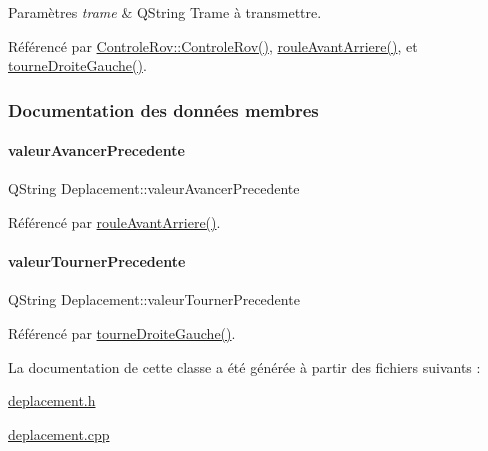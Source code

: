 \begin{DoxyParams}{Paramètres}
{\em trame} & Q\+String Trame à transmettre. \\
\hline
\end{DoxyParams}


Référencé par \hyperlink{class_controle_rov_acc4d5fea26770217df978d43df2ad51e}{Controle\+Rov\+::\+Controle\+Rov()}, \hyperlink{class_deplacement_a65a1c6adfe5114d3cfefa631e0c91618}{roule\+Avant\+Arriere()}, et \hyperlink{class_deplacement_a164cc606a6c5b8d55c1e5475d4d112e0}{tourne\+Droite\+Gauche()}.



\subsubsection{Documentation des données membres}
\mbox{\label{class_deplacement_a419b8bb201dc4a4e927beed68923f8eb}} 
\paragraph{\texorpdfstring{valeur\+Avancer\+Precedente}{valeurAvancerPrecedente}}
{\footnotesize\ttfamily Q\+String Deplacement\+::valeur\+Avancer\+Precedente\hspace{0.3cm}{\ttfamily [private]}}



Référencé par \hyperlink{class_deplacement_a65a1c6adfe5114d3cfefa631e0c91618}{roule\+Avant\+Arriere()}.

\mbox{\label{class_deplacement_a9d9b191747038f0f410626f38c4e75be}} 
\paragraph{\texorpdfstring{valeur\+Tourner\+Precedente}{valeurTournerPrecedente}}
{\footnotesize\ttfamily Q\+String Deplacement\+::valeur\+Tourner\+Precedente\hspace{0.3cm}{\ttfamily [private]}}



Référencé par \hyperlink{class_deplacement_a164cc606a6c5b8d55c1e5475d4d112e0}{tourne\+Droite\+Gauche()}.



La documentation de cette classe a été générée à partir des fichiers suivants \+:\begin{DoxyCompactItemize}
\item 
\hyperlink{deplacement_8h}{deplacement.\+h}\item 
\hyperlink{deplacement_8cpp}{deplacement.\+cpp}\end{DoxyCompactItemize}
